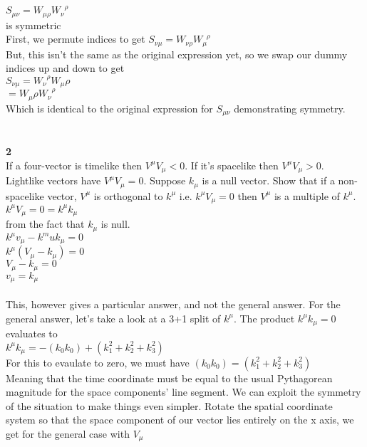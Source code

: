 \documentclass[prb,preprint]
{revtex4-1}
\newcommand{\PRLsep}{\noindent\makebox[\linewidth]{\resizebox{0.8888\linewidth}{2pt}{$\bullet$}}\bigskip}
\begin{document}
\\
$S_{\mu\nu} = W_{\mu\rho}W_\nu^{\;\;\rho}$
\\
is symmetric
\\
First, we permute indices to get
$S_{\nu\mu} = W_{\nu\rho}W_\mu^{\;\;\rho}$
\\
But, this isn't the same as the original expression yet, so we swap our dummy indices up and down to get 
\\
$S_{\nu\mu} = W_{\nu}^{\;\;\rho}W_\mu\rho$
\\
$= W_\mu\rho W_{\nu}^{\;\;\rho}$
\\
Which is identical to the original expression for $S_{\mu\nu}$ demonstrating symmetry.
\\
\PRLsep
\\
\\
\textbf{2}
\\
If a four-vector is timelike then $V^\mu V_\mu < 0$.  If it's spacelike then $V^\mu V_\mu > 0 $.  Lightlike vectors have $V^\mu V_\mu = 0$.  Suppose $k_\mu$ is a null vector.  Show that if a non-spacelike vector, $V^\mu$ is orthogonal to $k^\mu$ i.e. $k^\mu V_\mu = 0$ then $V^\mu$ is a multiple of $k^\mu$.
\\
$k^\mu V_\mu = 0 = k^\mu k_\mu$
\\
from the fact that $k_\mu$ is null.
\\
$k^\mu v_\mu - k^mu k_\mu = 0$
\\
$k^\mu\left(V_\mu - k_\mu\right) = 0$
\\
$V_\mu - k_\mu = 0$
\\
$v_\mu = k_\mu$
\\
\\
This, however gives a particular answer, and not the general answer.  For the general answer, let's take a look at a 3+1 split of $k^\mu$.  The product $k^\mu k_\mu = 0$ evaluates to 
\\
$k^\mu k_\mu = -\left(k_0 k_0\right) + \left(k_1^2 + k_2^2 + k_3^2\right)$
\\
For this to evaulate to zero, we must have 
$\left(k_0 k_0\right) = \left(k_1^2 + k_2^2 + k_3^2\right)$
\\
Meaning that the time coordinate must be equal to the usual Pythagorean magnitude for the space components' line segment.  We can exploit the symmetry of the situation to make things even simpler.  Rotate the spatial coordinate system so that the space component of our vector lies entirely on the x axis, we get for the general case with $V_\mu$
\\
\end{document}
